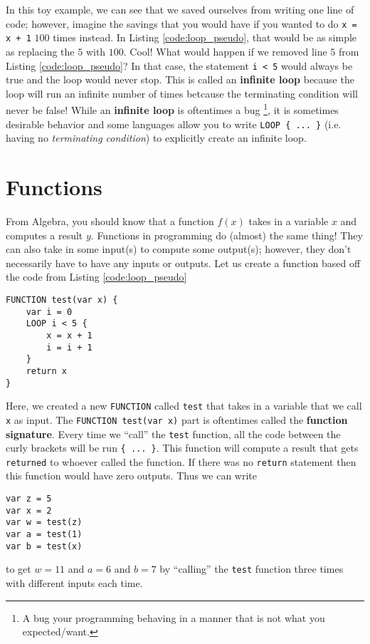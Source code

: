 \documentclass{article}
\begin{document}
In this toy example, we can see that we saved ourselves from writing one line of code; however, imagine the savings that you would have if you wanted to do \lstinline{x = x + 1} $100$ times instead.
In Listing \ref{code:loop_pseudo}, that would be as simple as replacing the $5$ with $100$.
Cool!
What would happen if we removed line $5$ from Listing \ref{code:loop_pseudo}?
In that case, the statement \lstinline{i < 5} would always be true and the loop would never stop.
This is called an \textbf{infinite loop} because the loop will run an infinite number of times betcause the terminating condition will never be false!
While an \textbf{infinite loop} is oftentimes a bug \footnote{A bug your programming behaving in a manner that is not what you expected/want.}, it is sometimes desirable behavior and some languages allow you to write \lstinline|LOOP { ... }| (i.e. having no \textit{terminating condition}) to explicitly create an infinite loop.

\section{Functions}

From Algebra, you should know that a function $f(x)$ takes in a variable $x$ and computes a result $y$.
Functions in programming do (almost) the same thing!
They can also take in some input(s) to compute some output(s); however, they don't necessarily have to have any inputs or outputs.
Let us create a function based off the code from Listing \ref{code:loop_pseudo}

\begin{lstlisting}[caption={Your first function.}, label={code:fn_pseudo}]
FUNCTION test(var x) {
    var i = 0
    LOOP i < 5 {
        x = x + 1
        i = i + 1
    }
    return x
}
\end{lstlisting}

Here, we created a new \lstinline{FUNCTION} called \lstinline{test} that takes in a variable that we call \lstinline{x} as input.
The \lstinline{FUNCTION test(var x)} part is oftentimes called the \textbf{function signature}.
Every time we ``call'' the \lstinline{test} function, all the code between the curly brackets will be run \lstinline|{ ... }|.
This function will compute a result that gets \lstinline{returned} to whoever called the function.
If there was no \lstinline{return} statement then this function would have zero outputs.
Thus we can write
\begin{lstlisting}[caption={Call test.}, label={code:call_fn_pseudo}]
var z = 5
var x = 2
var w = test(z)
var a = test(1)
var b = test(x)
\end{lstlisting}
to get $w = 11$ and $a = 6$ and $b = 7$ by ``calling'' the \lstinline{test} function three times with different inputs each time.
\end{document}
